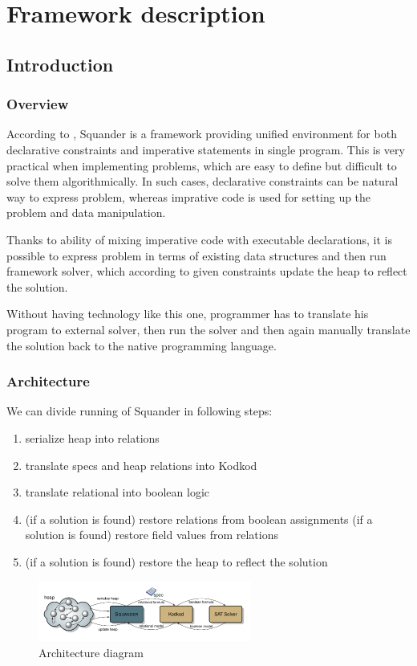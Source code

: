 \documentclass[11pt,twoside,a4paper]{book}
\begin{document}
\chapter{Framework description}
\label{chap:framework}
\section{Introduction}
\subsection{Overview}
According to \cite{web:squander}, Squander is a framework providing unified
environment for both declarative constraints and imperative statements in single program. This is very practical when
implementing problems, which are easy to define but difficult to solve them
algorithmically. In such cases, declarative constraints can be natural way to
express problem, whereas imprative code is used for setting up the problem and
data manipulation.

Thanks to ability of mixing imperative code with executable declarations, it is
possible to express problem in terms of existing data structures and then run
framework solver, which according to given constraints update the heap to
reflect the solution.


Without having technology like this one, programmer has to translate his program
to external solver, then run the solver and then again manually translate the
solution back to the native programming language.

\subsection{Architecture}
We can divide running of Squander in following steps\cite{web:squander}:
\begin{enumerate}
  \item serialize heap into relations
  \item translate specs and heap relations into Kodkod
  \item translate relational into boolean logic
  \item (if a solution is found) restore relations from boolean assignments
  (if a solution is found) restore field values from relations
  \item (if a solution is found) restore the heap to reflect the solution
   
\end{enumerate}
\begin{figure}[ht]
\begin{center}
\includegraphics[width=7cm]{figures/architecture-diagram}
\caption{Architecture diagram}
\label{fig:architecture}
\end{center}
\end{figure}
\end{document}
